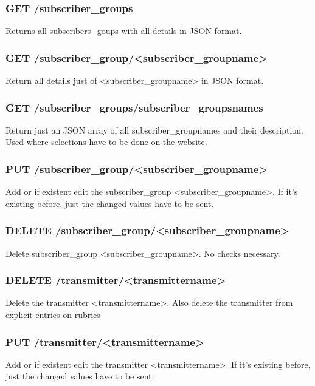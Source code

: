 \subsubsection{GET /subscriber\_groups}
Returns all subscribers\_goups with all details in JSON format.

\subsubsection{GET /subscriber\_group/<subscriber\_groupname>}
Return all details just of <subscriber\_groupname> in JSON format.

\subsubsection{GET /subscriber\_groups/subscriber\_groupsnames}
Return just an JSON array of all subscriber\_groupnames and their description. Used where selections have to be done on the website.

\subsubsection{PUT /subscriber\_group/<subscriber\_groupname>}
Add or if existent edit the subscriber\_group <subscriber\_groupname>. If it's existing before, just the changed values have to be sent.

\subsubsection{DELETE /subscriber\_group/<subscriber\_groupname>}
Delete subscriber\_group <subscriber\_groupname>. No checks necessary.

\subsubsection{DELETE /transmitter/<transmittername>}
Delete the transmitter <transmittername>. Also delete the transmitter from explicit entries on rubrics

\subsubsection{PUT /transmitter/<transmittername>}
Add or if existent edit the transmitter <transmittername>. If it's existing before, just the changed values have to be sent.

